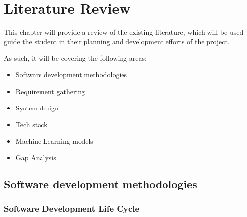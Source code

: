 \chapter{Literature Review}
\label{chap:lit_review}

This chapter will provide a review of the existing literature, which will be used guide the student in their planning and development efforts of the project.

\noindent As such, it will be covering the following areas:
\begin{itemize}
    \item Software development methodologies
    \item Requirement gathering
    \item System design
    \item Tech stack
    \item Machine Learning models
    \item Gap Analysis
\end{itemize}


\section{Software development methodologies}

\subsection{Software Development Life Cycle}

